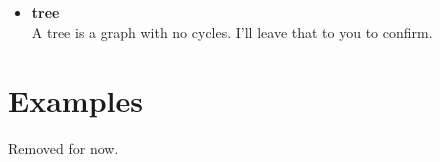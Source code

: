 \documentclass[11pt]{book}
\begin{document}
\begin{itemize}
\begin{center}
				\end{center}

			\item \textbf{tree} \\
				A tree is a graph with no cycles. I'll leave that to you to confirm.
		\end{itemize}

	\section{Examples}
		Removed for now.
\end{document}
